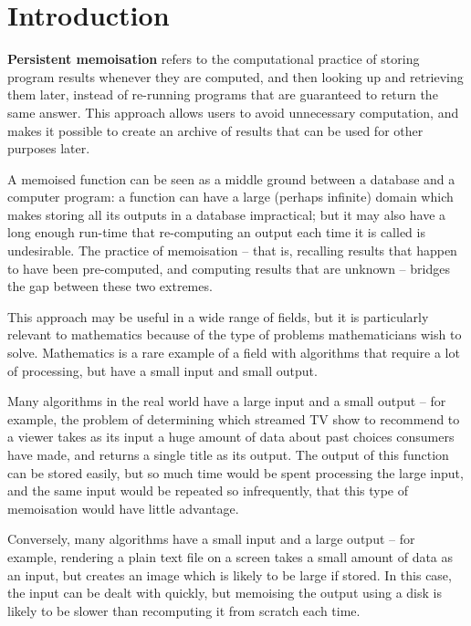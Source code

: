 \documentclass{deliverablereport}
\author{Michael Torpey}
\begin{document}
\maketitle
\githubissuedescription


\section{Introduction}
\label{sec:intro}

\textbf{Persistent memoisation} refers to the computational practice of storing
program results whenever they are computed, and then looking up and retrieving
them later, instead of re-running programs that are guaranteed to return the
same answer.  This approach allows users to avoid unnecessary computation, and
makes it possible to create an archive of results that can be used for other
purposes later.

A memoised function can be seen as a middle ground between a database and a
computer program: a function can have a large (perhaps infinite) domain which
makes storing all its outputs in a database impractical; but it may also have a
long enough run-time that re-computing an output each time it is called is
undesirable.  The practice of memoisation -- that is, recalling results that
happen to have been pre-computed, and computing results that are unknown --
bridges the gap between these two extremes.

This approach may be useful in a wide range of fields, but it is particularly
relevant to mathematics because of the type of problems mathematicians wish to
solve.  Mathematics is a rare example of a field with algorithms that require a
lot of processing, but have a small input and small output.

Many algorithms in the real world have a large input and a small output -- for
example, the problem of determining which streamed TV show to recommend to a
viewer takes as its input a huge amount of data about past choices consumers
have made, and returns a single title as its output.  The output of this
function can be stored easily, but so much time would be spent processing the
large input, and the same input would be repeated so infrequently, that this
type of memoisation would have little advantage.

Conversely, many algorithms have a small input and a large output -- for
example, rendering a plain text file on a screen takes a small amount of data as
an input, but creates an image which is likely to be large if stored.  In this
case, the input can be dealt with quickly, but memoising the output using a disk
is likely to be slower than recomputing it from scratch each time.
\end{document}
